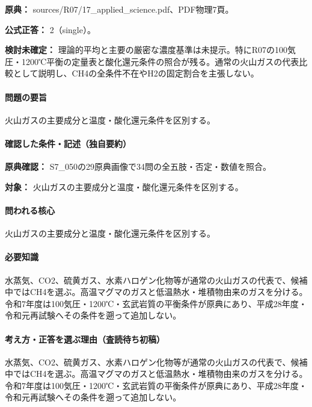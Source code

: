 \noindent\textbf{原典：} sources/R07/17\_applied\_science.pdf、PDF物理7頁。

\textbf{公式正答：} 2（single）。

\par\textbf{検討未確定：} 理論的平均と主要の厳密な濃度基準は未提示。特にR07の100気圧・1200℃平衡の定量表と酸化還元条件の照合が残る。通常の火山ガスの代表比較として説明し、CH4の全条件不在やH2の固定割合を主張しない。

\paragraph{問題の要旨} 火山ガスの主要成分と温度・酸化還元条件を区別する。

\paragraph{確認した条件・記述（独自要約）}\mbox{}\par

\noindent\textbf{原典確認：} S7\_050の29原典画像で34問の全五肢・否定・数値を照合。\par

\noindent\textbf{対象：} 火山ガスの主要成分と温度・酸化還元条件を区別する。\par

\paragraph{問われる核心} 火山ガスの主要成分と温度・酸化還元条件を区別する。

\paragraph{必要知識} 水蒸気、CO2、硫黄ガス、水素ハロゲン化物等が通常の火山ガスの代表で、候補中ではCH4を選ぶ。高温マグマのガスと低温熱水・堆積物由来のガスを分ける。令和7年度は100気圧・1200℃・玄武岩質の平衡条件が原典にあり、平成28年度・令和元再試験へその条件を遡って追加しない。

\paragraph{考え方・正答を選ぶ理由（査読待ち初稿）} 水蒸気、CO2、硫黄ガス、水素ハロゲン化物等が通常の火山ガスの代表で、候補中ではCH4を選ぶ。高温マグマのガスと低温熱水・堆積物由来のガスを分ける。令和7年度は100気圧・1200℃・玄武岩質の平衡条件が原典にあり、平成28年度・令和元再試験へその条件を遡って追加しない。

